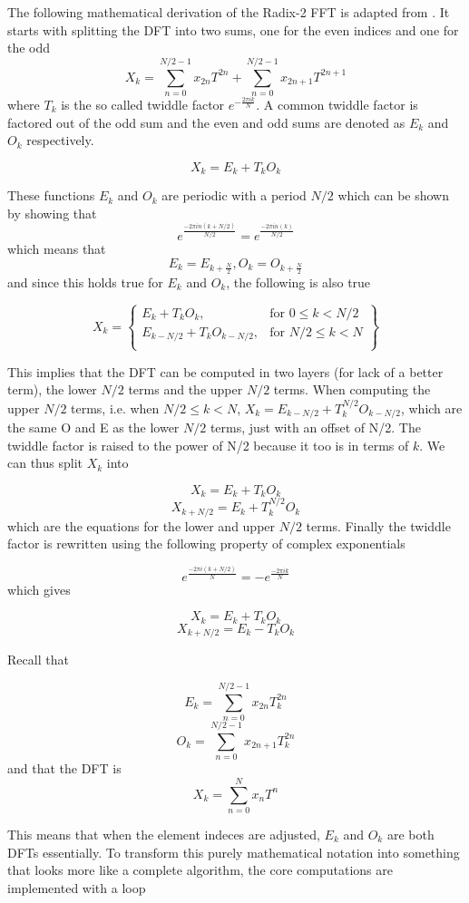 The following mathematical derivation of the Radix-2 FFT is adapted from \cite{Rozman2019}. It starts with splitting the DFT into two sums, one for the even indices and one for the odd 
$$X_k = \sum^{N/2-1}_{n=0} x_{2n}T^{2n}+ \sum^{N/2-1}_{n=0} x_{2n+1}T^{2n+1}$$
where $T_k$ is the so called twiddle factor $e^{-\frac{2\pi ik}{N}}$. A common twiddle factor is factored out of the odd sum and the even and odd sums are denoted as $E_k$ and $O_k$ respectively. 

$$X_k = E_k + T_kO_k$$

These functions $E_k$ and $O_k$ are periodic with a period $N/2$ which can be shown by showing that $$e^{\frac{-2\pi in(k+N/2)}{N/2}} = e^{\frac{-2\pi in(k)}{N/2}}$$
which means that 
$$E_k = E_{k+\frac{N}{2}}, O_k = O_{k+\frac{N}{2}}$$
and since this holds true for $E_k$ and $O_k$, the following is also true

\[
X_k = \left\{\begin{array}{lr}
    E_k + T_kO_k, & \text{for } 0 \leq k < N/2\\
    E_{k-N/2} + T_kO_{k-N/2}, & \text{for } N/2\leq k< N\\
    \end{array}\right\}
\]

This implies that the DFT can be computed in two layers (for lack of a better term), the lower $N/2$ terms and the upper $N/2$ terms.
When computing the upper $N/2$ terms, i.e. when $N/2 \leq k < N$, $X_k = E_{k-N/2} + T_k^{N/2}O_{k-N/2}$, which are the same O and E as the lower $N/2$ terms, just with an offset of N/2. The twiddle factor is raised to the power of N/2 because it too is in terms of $k$. We can thus split $X_k$ into 

$$X_k = E_k + T_kO_k$$  
$$X_{k+N/2} = E_k + T_k^{N/2}O_k$$
which are the equations for the lower and upper $N/2$ terms. Finally the twiddle factor is rewritten using the following property of complex exponentials

$$e^{\frac{-2\pi i(k+N/2)}{N}} = -e^{\frac{-2\pi ik}{N}}$$
which gives

$$X_k = E_k + T_kO_k$$  
$$X_{k+N/2} = E_k - T_kO_k$$

Recall that

$$E_k = \sum^{N/2-1}_{n=0} x_{2n}T_k^{2n}$$
$$O_k = \sum^{N/2-1}_{n=0} x_{2n+1}T_k^{2n}$$
and that the DFT is
$$X_k = \sum^{N}_{n=0} x_nT^{n}$$

This means that when the element indeces are adjusted, $E_k$ and $O_k$ are both DFTs essentially. To transform this purely mathematical notation into something that looks more like a complete algorithm, the core computations are implemented with a loop

